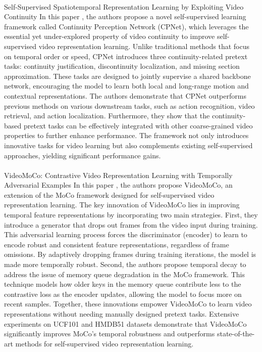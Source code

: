 \documentclass[11pt,a4paper]{report}
\begin{document}
\paragraph{} Self-Supervised Spatiotemporal Representation Learning by Exploiting Video Continuity
In this paper \cite{Liang2022}, the authors propose a novel self-supervised learning framework called Continuity Perception Network (CPNet), which leverages the essential yet under-explored property of video continuity to improve self-supervised video representation learning. Unlike traditional methods that focus on temporal order or speed, CPNet introduces three continuity-related pretext tasks: continuity justification, discontinuity localization, and missing section approximation. These tasks are designed to jointly supervise a shared backbone network, encouraging the model to learn both local and long-range motion and contextual representations. The authors demonstrate that CPNet outperforms previous methods on various downstream tasks, such as action recognition, video retrieval, and action localization. Furthermore, they show that the continuity-based pretext tasks can be effectively integrated with other coarse-grained video properties to further enhance performance. The framework not only introduces innovative tasks for video learning but also complements existing self-supervised approaches, yielding significant performance gains.

\paragraph{} VideoMoCo: Contrastive Video Representation Learning with Temporally Adversarial Examples
In this paper \cite{Pan2021}, the authors propose VideoMoCo, an extension of the MoCo framework designed for self-supervised video representation learning. The key innovation of VideoMoCo lies in improving temporal feature representations by incorporating two main strategies. First, they introduce a generator that drops out frames from the video input during training. This adversarial learning process forces the discriminator (encoder) to learn to encode robust and consistent feature representations, regardless of frame omissions. By adaptively dropping frames during training iterations, the model is made more temporally robust. Second, the authors propose temporal decay to address the issue of memory queue degradation in the MoCo framework. This technique models how older keys in the memory queue contribute less to the contrastive loss as the encoder updates, allowing the model to focus more on recent samples. Together, these innovations empower VideoMoCo to learn video representations without needing manually designed pretext tasks. Extensive experiments on UCF101 and HMDB51 datasets demonstrate that VideoMoCo significantly improves MoCo's temporal robustness and outperforms state-of-the-art methods for self-supervised video representation learning.
\end{document}
